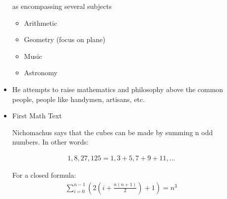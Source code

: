 \documentclass{report}
\begin{document}
\begin{description}
\begin{mdframed}
\begin{itemize}
                    as encompassing several subjects
                    \begin{itemize}
                        \item Arithmetic
                        \item Geometry (focus on plane)
                        \item Music
                        \item Astronomy
                    \end{itemize}
                \item He attempts to raise mathematics and
                    philosophy above the common people,
                    people like handymen, artisans, etc.
                \item First Math Text
                    \begin{mdframed}
                        Nichomachus says that the cubes
                        can be made by summing n odd numbers.
                        In other words:

                        \begin{gather}
                           1, 8, 27, 125 
                           = 1, 3 + 5, 7 + 9 + 11, ...
                        \end{gather}

                        For a closed formula:
                        \begin{gather}
                            \sum_{i=0}^{n-1} (2(i + \frac{n(n+1)}{2})+1) = n^3 
                        \end{gather}


\end{mdframed}
\end{itemize}
\end{mdframed}
\end{description}
\end{document}
